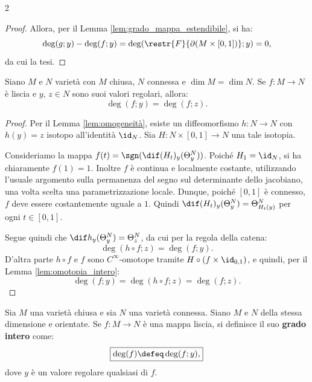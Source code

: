 \begin{multicols*}{2}
\begin{proof}
        Allora, per il Lemma \ref{lem:grado_mappa_estendibile}, si ha:
        \[
            \deg(g; y) - \deg(f; y) = \deg(\restr{F}{\partial(M \times [0, 1])}; y) = 0,
        \]
        da cui la tesi.
    \end{proof}

    \begin{theorem} \label{thm:grado_intero_ben_definito}
        Siano $M$ e $N$ varietà con $M$ chiusa, $N$ connessa e $\dim M = \dim N$. Se
        $f : M \to N$ è liscia e $y$, $z \in N$ sono suoi valori regolari, allora:
        \[
            \boxed{\deg(f; y) = \deg(f; z).}
        \]
    \end{theorem}

    \begin{proof}
        Per il Lemma \ref{lem:omogeneità}, esiste un diffeomorfismo $h : N \to N$
        con $h(y) = z$ isotopo all'identità $\id_N$. Sia $H : N \times [0, 1] \to N$
        una tale isotopia. \smallskip

        Consideriamo la mappa $f(t) = \sgn(\dif (H_t)_y (\Theta^N_y))$. Poiché
        $H_1 = \id_N$, si ha chiaramente $f(1) = 1$. Inoltre $f$ è continua e localmente
        costante, utilizzando l'usuale argomento sulla permanenza del segno
        sul determinante dello jacobiano, una volta scelta una parametrizzazione locale.
        Dunque, poiché $[0, 1]$ è connesso, $f$ deve essere costantemente uguale a $1$.
        Quindi $\dif (H_t)_y (\Theta^N_y) = \Theta^N_{H_t(y)}$ per ogni $t \in [0, 1]$. \smallskip

        Segue quindi che $\dif h_y (\Theta^N_y) = \Theta^N_z$, da cui per la regola della catena:
        \[
            \deg(h \circ f; z) = \deg(f; y).
        \]
        D'altra parte $h \circ f$ e $f$ sono $C^\infty$-omotope tramite $H \circ (f \times \id_{0, 1})$,
        e quindi, per il Lemma \ref{lem:omotopia_intero}:
        \[
            \deg(f; y) = \deg(h \circ f; z) = \deg(f; z).
        \]
    \end{proof}

    \begin{definition}
        Sia $M$ una varietà chiusa e sia $N$ una varietà connessa.
        Siano $M$ e $N$ della stessa dimensione e orientate. Se
        $f : M \to N$ è una mappa liscia, si definisce il suo
        \textbf{grado intero} come:
        \[
            \boxed{\deg(f) \defeq \deg(f; y),}
        \]
        dove $y$ è un valore regolare qualsiasi di $f$.
    \end{definition}


\end{multicols*}
